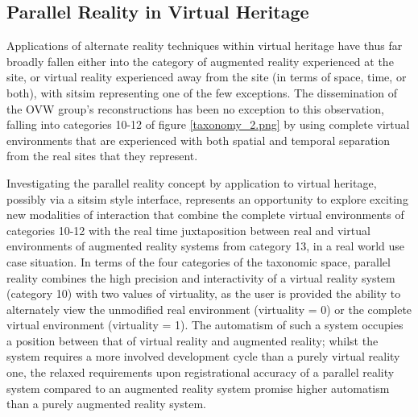 
\subsection{Parallel Reality in Virtual Heritage}

\label{parallel-reality-in-virtual-heritage}


Applications of alternate reality techniques within virtual heritage have thus far broadly fallen either into the category of augmented reality experienced at the site, or virtual reality experienced away from the site (in terms of space, time, or both), with sitsim representing one of the few exceptions. The dissemination of the OVW group's reconstructions has been no exception to this observation, falling into categories 10-12 of figure \ref{taxonomy_2.png} by using complete virtual environments that are experienced with both spatial and temporal separation from the real sites that they represent.

Investigating the parallel reality concept by application to virtual heritage, possibly via a sitsim style interface, represents an opportunity to explore exciting new modalities of interaction that combine the complete virtual environments of categories 10-12 with the real time juxtaposition between real and virtual environments of augmented reality systems from category 13, in a real world use case situation. In terms of the four categories of the taxonomic space, parallel reality combines the high precision and interactivity of a virtual reality system (category 10) with two values of virtuality, as the user is provided the ability to alternately view the unmodified real environment (virtuality = 0) or the complete virtual environment (virtuality = 1). The automatism of such a system occupies a position between that of virtual reality and augmented reality; whilst the system requires a more involved development cycle than a purely virtual reality one, the relaxed requirements upon registrational accuracy of a parallel reality system compared to an augmented reality system promise higher automatism than a purely augmented reality system.



